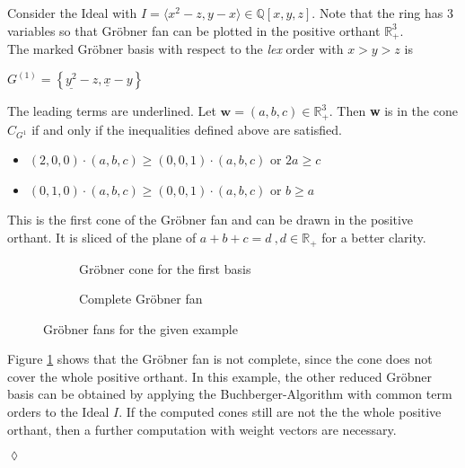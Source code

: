 \begin{env_example}\normalfont
\label{ex:groebnerfan}
Consider the Ideal with $ I = \langle x^{2}-z,y-x \rangle \in \mathbb{Q}\left[ x,y,z\right] .$
Note that the ring has 3 variables so that Gröbner fan can be plotted in the positive orthant $ \mathbb{R}^{3}_{+}$. \\
The marked Gröbner basis with respect to the \textit{lex} order with $x>y>z$ is
\begin{center}
$G^{\left( 1\right) } = \left\lbrace \underline{y^{2}}-z,\underline{x} -y\right\rbrace $
\end{center}
The leading terms are underlined. Let $\textbf{w} = \left( a,b,c\right) \in \mathbb{R}^{3}_{+} $. Then \textbf{w} is in the cone $C_{G^{1}}$ if and only if the inequalities defined above are satisfied.

\begin{itemize}

\item
$\left( 2,0,0\right) \cdot \left( a,b,c\right) \geq \left( 0,0,1\right) \cdot \left( a,b,c\right) $ or $2a\geq c$ 
\item
$\left( 0,1,0\right) \cdot \left( a,b,c\right) \geq \left( 0,0,1\right) \cdot \left( a,b,c\right) $ or $b\geq a$ 

\end{itemize} 

This is the first cone of the Gröbner fan and can be drawn in the positive orthant. It is sliced of the plane of $a+b+c=d~,d\in \mathbb{R}_+$ for a better clarity.


\begin{figure}
    \centering
    \begin{subfigure}[b]{0.48\linewidth}        %
        \centering
        
        \caption{Gröbner cone for the first basis}
        \label{fig:singlegroebner}
    \end{subfigure}
    \begin{subfigure}[b]{0.48\linewidth}        %
        \centering
        
        \caption{Complete Gröbner fan}
        \label{fig:completegroebner}
    \end{subfigure}
    \caption{Gröbner fans for the given example}
    \label{fig:groebnerfans}
\end{figure}




Figure \ref{fig:singlegroebner} shows that the Gröbner fan is not complete, since the cone does not cover the whole positive orthant. In this example, the other reduced Gröbner basis can be obtained by applying the Buchberger-Algorithm with common term orders to the Ideal $I$.
If the computed cones still are not the the whole positive orthant, then a further computation with weight vectors are necessary.
\begin{flushright}
$\lozenge$
\end{flushright} 
\end{env_example}

